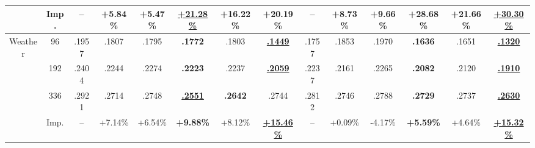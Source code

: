 \documentclass{article}
\begin{document}
\begin{table}[t]
{\begin{tabular}{cc*{12}{c}}
 & Imp. & -- & +5.84\% & +5.47\% & \underline{\textbf{+21.28\%}} & +16.22\% & \textbf{+20.19\%} & -- & +8.73\% & +9.66\% & \textbf{+28.68\%} & +21.66\% & \underline{\textbf{+30.30\%}} \\
\midrule
\multirow{4}{*}{Weather} & 96 & .1957 & .1807 & .1795 & \textbf{.1772} & .1803 & \underline{\textbf{.1449}} & .1757 & .1853 & .1970 & \textbf{.1636} & .1651 & \underline{\textbf{.1320}} \\
 & 192 & .2404 & .2244 & .2274 & \textbf{.2223} & .2237 & \underline{\textbf{.2059}} & .2237 & .2161 & .2265 & \textbf{.2082} & .2120 & \underline{\textbf{.1910}} \\
 & 336 & .2921 & .2714 & .2748 & \underline{\textbf{.2551}} & \textbf{.2642} & .2744 & .2812 & .2746 & .2788 & \textbf{.2729} & .2737 & \underline{\textbf{.2630}} \\
 & Imp. & -- & +7.14\% & +6.54\% & \textbf{+9.88\%} & +8.12\% & \underline{\textbf{+15.46\%}} & -- & +0.09\% & -4.17\% & \textbf{+5.59\%} & +4.64\% & \underline{\textbf{+15.32\%}} \\
\bottomrule
\end{tabular}}
\end{table}
\end{document}
